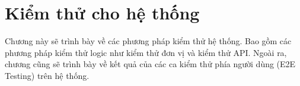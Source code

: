 \section{Kiểm thử cho hệ thống}

Chương này sẽ trình bày về các phương pháp kiểm thử hệ thống. Bao gồm các phương pháp kiểm thử logic như kiểm thử đơn vị và kiểm thử API. Ngoài ra, chương cũng sẽ trình bày về kết quả của các ca kiểm thử phía người dùng (E2E Testing) trên hệ thống.



